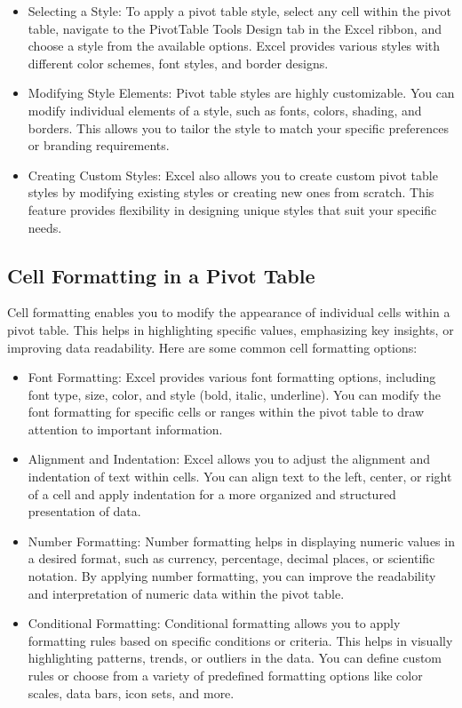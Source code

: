 \documentclass[
]{book}
\begin{document}
\begin{itemize}
\item
  Selecting a Style: To apply a pivot table style, select any cell within the pivot table, navigate to the PivotTable Tools Design tab in the Excel ribbon, and choose a style from the available options. Excel provides various styles with different color schemes, font styles, and border designs.
\item
  Modifying Style Elements: Pivot table styles are highly customizable. You can modify individual elements of a style, such as fonts, colors, shading, and borders. This allows you to tailor the style to match your specific preferences or branding requirements.
\item
  Creating Custom Styles: Excel also allows you to create custom pivot table styles by modifying existing styles or creating new ones from scratch. This feature provides flexibility in designing unique styles that suit your specific needs.
\end{itemize}

\hypertarget{cell-formatting-in-a-pivot-table}{%
\subsection{Cell Formatting in a Pivot Table}\label{cell-formatting-in-a-pivot-table}}

Cell formatting enables you to modify the appearance of individual cells within a pivot table. This helps in highlighting specific values, emphasizing key insights, or improving data readability. Here are some common cell formatting options:

\begin{itemize}
\item
  Font Formatting: Excel provides various font formatting options, including font type, size, color, and style (bold, italic, underline). You can modify the font formatting for specific cells or ranges within the pivot table to draw attention to important information.
\item
  Alignment and Indentation: Excel allows you to adjust the alignment and indentation of text within cells. You can align text to the left, center, or right of a cell and apply indentation for a more organized and structured presentation of data.
\item
  Number Formatting: Number formatting helps in displaying numeric values in a desired format, such as currency, percentage, decimal places, or scientific notation. By applying number formatting, you can improve the readability and interpretation of numeric data within the pivot table.
\item
  Conditional Formatting: Conditional formatting allows you to apply formatting rules based on specific conditions or criteria. This helps in visually highlighting patterns, trends, or outliers in the data. You can define custom rules or choose from a variety of predefined formatting options like color scales, data bars, icon sets, and more.
\end{itemize}
\end{document}
